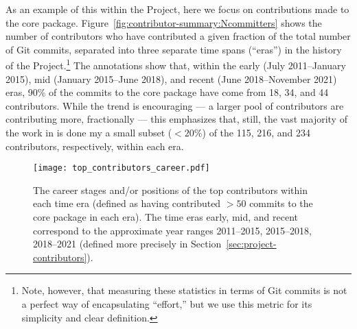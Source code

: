 \documentclass[modern]{aastex631}
\begin{document}
As an example of this within the \astropy Project, here we focus on
contributions made to the \astropypkg core package.
Figure~\ref{fig:contributor-summary:Ncommitters} shows the number of
contributors who have contributed a given fraction of the total number of Git
commits, separated into three separate time spans (``eras'') in the history of
the Project.\footnote{Note, however, that measuring these statistics in terms of
Git commits is not a perfect way of encapsulating ``effort,'' but we use this
metric for its simplicity and clear definition.}
The annotations show that, within the early (July 2011--January 2015), mid
(January 2015--June 2018), and recent (June 2018--November 2021) eras, 90\% of
the commits to the \astropypkg core package have come from 18, 34, and 44
contributors.
While the trend is encouraging --- a larger pool of contributors are
contributing more, fractionally --- this emphasizes that, still, the vast
majority of the work in \astropypkg is done my a small subset ($<20\%$) of the
115, 216, and 234 contributors, respectively, within each era.

\begin{figure}[t!]
    \begin{centering}
      \texttt{[image: top\_contributors\_career.pdf]}
        \caption{
            The career stages and/or positions of the top contributors within
            each time era (defined as having contributed $>50$ commits to the
            \astropypkg core package in each era).
            The time eras early, mid, and recent correspond to the approximate
            year ranges 2011--2015, 2015--2018, 2018--2021 (defined more
            precisely in Section~\ref{sec:project-contributors}).
        }
        \label{fig:contributor-summary:top}
    \end{centering}
\end{figure}
\end{document}
